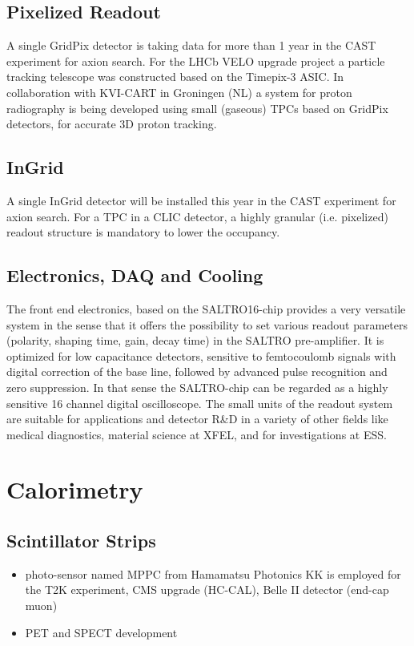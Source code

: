 \subsection{Pixelized Readout}
A single GridPix detector is taking data for more than 1 year in the CAST
experiment for axion search.
For the LHCb VELO upgrade project a particle tracking telescope was constructed
based on the Timepix-3 ASIC.
In collaboration with KVI-CART in Groningen (NL) a system for proton radiography
is being developed using small (gaseous) TPCs based on GridPix detectors, for
accurate 3D proton tracking.

\subsection{InGrid}
A single InGrid detector will be installed this year in the CAST experiment for axion search. For a TPC in a CLIC detector, a highly granular (i.e. pixelized) readout structure is mandatory to lower the occupancy.

\subsection{Electronics, DAQ and Cooling}
The front end electronics, based on the SALTRO16-chip provides a very versatile system in the sense that it offers the possibility to set various readout parameters (polarity, shaping time, gain, decay time) in the SALTRO pre-amplifier. It is optimized for low capacitance detectors, sensitive to femtocoulomb signals with digital correction of the base line, followed by advanced pulse recognition and zero suppression.  In that sense the SALTRO-chip can be regarded as a highly sensitive 16 channel digital oscilloscope. The small units of the readout system are suitable for applications and detector R\&D in a variety of other fields like medical diagnostics, material science at XFEL, and for investigations at ESS.

\section{Calorimetry}
\subsection{Scintillator Strips}
\begin{itemize}
	\item photo-sensor named MPPC from Hamamatsu Photonics KK is employed for the T2K experiment, CMS upgrade (HC-CAL), Belle II detector (end-cap muon)
	\item PET and SPECT development
\end{itemize}

